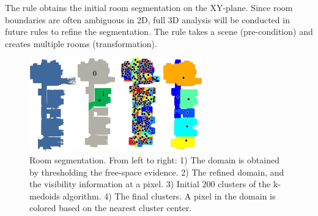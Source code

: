  The rule obtains the initial room
segmentation on the XY-plane. Since room boundaries are often ambiguous
in 2D, full 3D analysis will be conducted in future rules to refine the
segmentation. The rule takes a scene (pre-condition) and creates
multiple rooms (transformation).
%
%
%
%
\begin{figure}[!t]
\begin{center}
 \includegraphics[width=75mm]{../figures/k-medoids2.pdf}
\end{center}
\caption{Room segmentation. From left to right: 1) The domain is
 obtained by thresholding the free-space evidence. 2) The refined
 domain, and the visibility information at a pixel. 3) Initial 200 clusters
 of the k-medoids algorithm. 4) The final clusters. A pixel in the
 domain is colored based on the nearest cluster center.
 }
\label{fig:k-medoids}
 \vspace{-0.325cm}
\end{figure}


